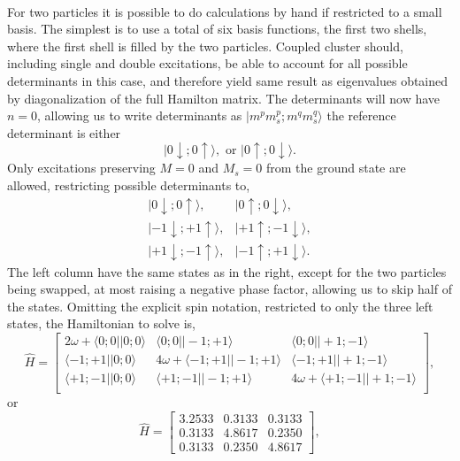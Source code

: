 \paragraph{}
For two particles it is possible to do calculations by hand if restricted to a small basis.
The simplest is to use a total of six basis functions, the first two shells, where the first shell is filled by the two particles.
Coupled cluster should, including single and double excitations, be able to account for all possible determinants in this case, and therefore yield same result as eigenvalues obtained by diagonalization of the full Hamilton matrix.
The determinants will now have $n=0$, allowing us to write determinants as $|m^pm_s^p;m^qm_s^q\rangle$ the reference determinant is either 
\begin{equation}
|0\downarrow;0\uparrow\rangle ,\textrm{ or } |0\uparrow;0\downarrow\rangle .
\end{equation}
Only excitations preserving $M=0$ and $M_s=0$ from the ground state are allowed, restricting possible determinants to, 
\begin{equation}
\begin{matrix}
|0\downarrow;0\uparrow\rangle ,  &  |0\uparrow;0\downarrow\rangle , \\
|-1\downarrow;+1\uparrow\rangle , & |+1\uparrow;-1\downarrow\rangle , \\
|+1\downarrow;-1\uparrow\rangle ,  &  |-1\uparrow;+1\downarrow\rangle . 
\end{matrix}
\end{equation}
The left column have the same states as in the right, except for the two particles being swapped, at most raising a negative phase factor, allowing us to skip half of the states.
Omitting the explicit spin notation, restricted to only the three left states, the Hamiltonian to solve is,
\begin{equation}
\hat{H}
=
\begin{bmatrix}
2\omega + \langle 0;0||0;0\rangle 
   &  \langle 0;0||-1;+1\rangle  
   & \langle 0;0||+1;-1\rangle \\
\langle-1;+1||0;0\rangle 
   & 4\omega + \langle-1;+1||-1;+1\rangle 
   &  \langle-1;+1||+1;-1\rangle    \\
\langle+1;-1||0;0\rangle 
   & \langle+1;-1||-1;+1\rangle 
   & 4\omega + \langle+1;-1||+1;-1\rangle    \\
\end{bmatrix} , 
\end{equation}
or 
\begin{equation}
\hat{H}
=
\begin{bmatrix}
3.2533 & 0.3133 & 0.3133 \\
0.3133 & 4.8617 & 0.2350 \\
0.3133 & 0.2350 & 4.8617 
\end{bmatrix},
\end{equation}
